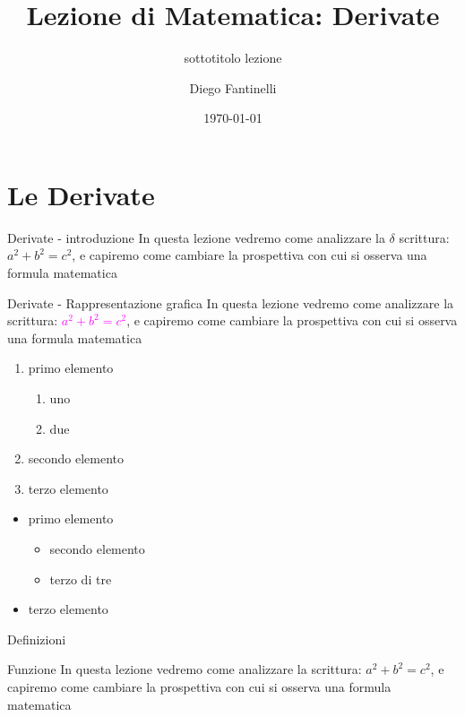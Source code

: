 \documentclass[aspectratio=169]{beamer}
\title[Titolo in basso a destra]{Lezione di Matematica: Derivate}
\subtitle{sottotitolo lezione}
\date{\today}
\author{Diego Fantinelli}
\institute{Matematica per il Liceo}
\begin{document}

\begin{frame}
	\titlepage
\end{frame}


\section{Le Derivate}

\begin{frame}[t]{Derivate - introduzione} \vspace{10pt}
In questa lezione vedremo come analizzare la $\delta$ scrittura: $a^2+b^2=c^2$, e capiremo come cambiare la prospettiva con cui si osserva una formula matematica\\
\end{frame}

\begin{frame}[t]{Derivate - Rappresentazione grafica} \vspace{5pt}
In questa lezione vedremo come analizzare la scrittura: \textcolor{magenta}{$a^2+b^2=c^2$}, e capiremo come cambiare la prospettiva con cui si osserva una formula matematica\\

\begin{enumerate}
	\item primo elemento
	\begin{enumerate}
		\item uno
		\item due
	\end{enumerate}
	\item secondo elemento
	\item terzo elemento
\end{enumerate}

\begin{itemize}
	\item primo elemento
		\begin{itemize}
			\item secondo elemento
			\item terzo di tre
		\end{itemize}
	\item terzo elemento
\end{itemize}
\end{frame}

\begin{frame}[t]{Definizioni} \vspace{10pt}
\begin{block}{Funzione}
\vspace{0.5em}
In questa lezione vedremo come analizzare la scrittura: $a^2+b^2=c^2$, e capiremo come cambiare la prospettiva con cui si osserva una formula matematica
\vspace{0.5em}	

\end{block}
\end{frame}
\end{document}
